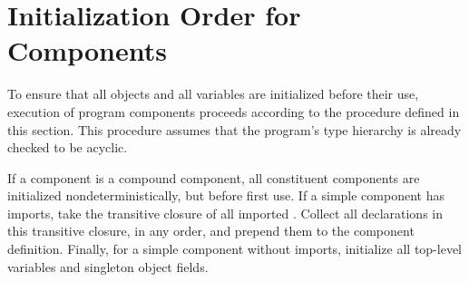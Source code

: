 %
%
%
%

\section{Initialization Order for Components}

To ensure that all objects and all variables are initialized before their
use, execution of program components
proceeds according to the procedure defined in this section.
This procedure assumes that the program's type hierarchy is already checked
to be acyclic.


If a component is a compound component,
all constituent components are initialized nondeterministically, but before
first use.
If a simple component has imports,
take the transitive closure of all imported \apisN.  Collect all
  declarations in this transitive closure, in any order, and prepend
  them to the component definition.
Finally, for a simple component without imports,
initialize all top-level variables and singleton object fields.
